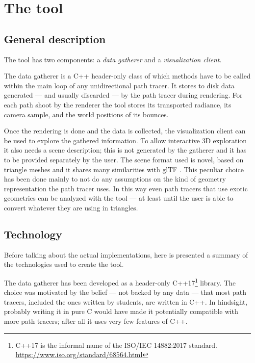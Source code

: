 \chapter{The tool}

\section{General description}
\label{tool_general_description}
The tool has two components: a \textit{data gatherer} and a \textit{visualization client}.

The data gatherer is a C++ header-only class of which methods have to be called within the main loop of any unidirectional path tracer. It stores to disk data generated --- and usually discarded --- by the path tracer during rendering. For each path shoot by the renderer the tool stores its transported radiance, its camera sample, and the world positions of its bounces. 

Once the rendering is done and the data is collected, the visualization client can be used to explore the gathered information. To allow interactive 3D exploration it also needs a scene description; this is not generated by the gatherer and it has to be provided separately by the user. The scene format used is novel, based on triangle meshes and it shares many similarities with glTF \cite{robinet2014gltf}. This peculiar choice has been done mainly to not do any assumptions on the kind of geometry representation the path tracer uses. In this way even path tracers that use exotic geometries can be analyzed with the tool --- at least until the user is able to convert whatever they are using in triangles.

\section{Technology}
\label{technology}

Before talking about the actual implementations, here is presented a summary of the technologies used to create the tool.

The data gatherer has been developed as a header-only C++17\footnote{C++17 is the informal name of the ISO/IEC 14882:2017 standard. \url{https://www.iso.org/standard/68564.html}} library. The choice was motivated by the belief --- not backed by any data --- that most path tracers, included the ones written by students, are written in C++. In hindsight, probably writing it in pure C would have made it potentially compatible with more path tracers; after all it uses very few features of C++. 

